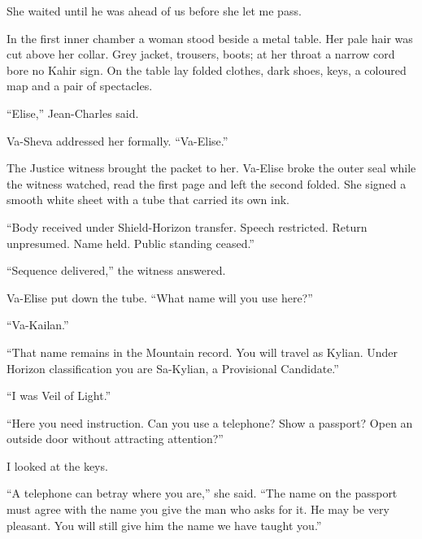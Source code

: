 She waited until he was ahead of us before she let me pass.\par

In the first inner chamber a woman stood beside a metal table. Her pale hair was cut above her collar. Grey jacket, trousers, boots; at her throat a narrow cord bore no Kahir sign. On the table lay folded clothes, dark shoes, keys, a coloured map and a pair of spectacles.\par

``Elise,'' Jean-Charles said.\par

Va-Sheva addressed her formally. ``Va-Elise.''\par

The Justice witness brought the packet to her. Va-Elise broke the outer seal while the witness watched, read the first page and left the second folded. She signed a smooth white sheet with a tube that carried its own ink.\par

``Body received under Shield-Horizon transfer. Speech restricted. Return unpresumed. Name held. Public standing ceased.''\par

``Sequence delivered,'' the witness answered.\par

Va-Elise put down the tube. ``What name will you use here?''\par

``Va-Kailan.''\par

``That name remains in the Mountain record. You will travel as Kylian. Under Horizon classification you are Sa-Kylian, a Provisional Candidate.''\par

``I was Veil of Light.''\par

``Here you need instruction. Can you use a telephone? Show a passport? Open an outside door without attracting attention?''\par

I looked at the keys.\par

``A telephone can betray where you are,'' she said. ``The name on the passport must agree with the name you give the man who asks for it. He may be very pleasant. You will still give him the name we have taught you.''\par

